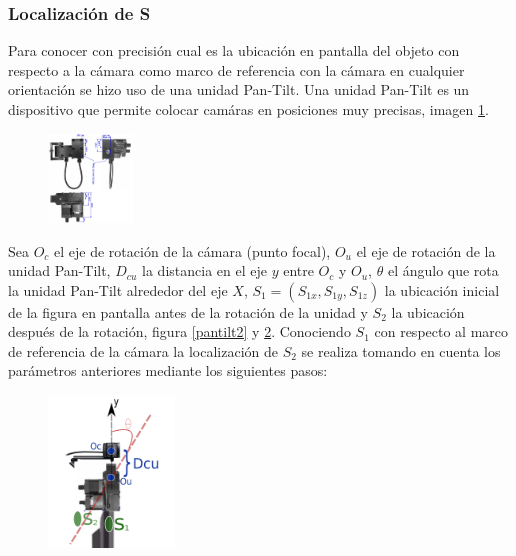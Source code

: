        \subsubsection{Localización de S}
       Para conocer con precisión cual es la ubicación en pantalla del objeto con respecto a la cámara como marco de referencia con la cámara en cualquier orientación se hizo uso de una unidad Pan-Tilt. Una unidad Pan-Tilt es un dispositivo que permite colocar camáras  en posiciones muy precisas, imagen \ref{pantilt}.\\
          \begin{figure}[htbp]
           	\centering
           	\includegraphics[width=0.2\textwidth]{./pictures/pantilt}
           	\caption{}\label{fig: figura}
           	\label{pantilt}
        \end{figure}
     Sea $O_c$ el eje de rotación de la cámara (punto focal), $O_u$ el eje de rotación de la unidad Pan-Tilt, $D_{cu}$ la distancia en el eje $y$ entre $O_c$ y $O_u$, $\theta$ el ángulo que rota la unidad Pan-Tilt alrededor del eje $X$, $S_1=(S_{1x}, S_{1y}, S_{1z})$ la ubicación inicial de la figura en pantalla antes de la rotación de la unidad y $S_2$ la ubicación después de la rotación, figura \ref{pantilt2} y \ref{pantilt3}. Conociendo $S_1$ con respecto al marco de referencia de la cámara la localización de $S_2$ se realiza tomando en cuenta los parámetros anteriores mediante los siguientes pasos:
              \begin{figure}[htbp]
              	\centering
              	\includegraphics[width=0.3\textwidth]{./pictures/pantilt3}
              	\caption{}\label{fig: figura}
              	\label{pantilt3}
              \end{figure}
